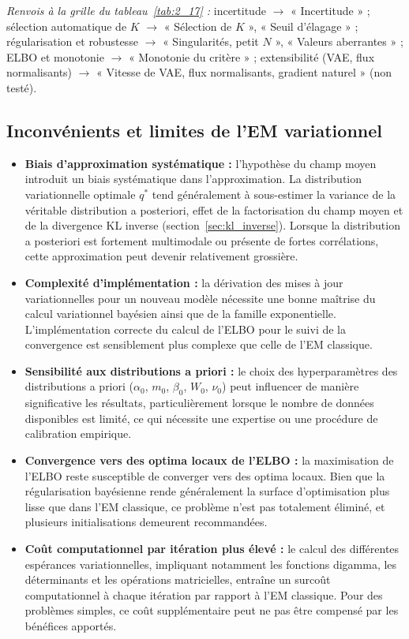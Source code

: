 \par\noindent\emph{Renvois à la grille du tableau~\ref{tab:2_17} :} incertitude $\to$ « Incertitude » ; sélection automatique de $K$ $\to$ « Sélection de $K$ », « Seuil d'élagage » ; régularisation et robustesse $\to$ « Singularités, petit $N$ », « Valeurs aberrantes » ; ELBO et monotonie $\to$ « Monotonie du critère » ; extensibilité (VAE, flux normalisants) $\to$ « Vitesse de VAE, flux normalisants, gradient naturel » (non testé).
\subsection{Inconvénients et limites de l'EM variationnel}\label{sec:limites_vb}
\begin{itemize}
\item \textbf{Biais d'approximation systématique : }l'hypothèse du champ moyen introduit un biais systématique dans l'approximation. La distribution variationnelle optimale $q^{*}$ tend généralement à sous-estimer la variance de la véritable distribution a posteriori, effet de la factorisation du champ moyen et de la divergence KL inverse (section~\ref{sec:kl_inverse}). Lorsque la distribution a posteriori est fortement multimodale ou présente de fortes corrélations, cette approximation peut devenir relativement grossière.
\item \textbf{Complexité d'implémentation : }la dérivation des mises à jour variationnelles pour un nouveau modèle nécessite une bonne maîtrise du calcul variationnel bayésien ainsi que de la famille exponentielle. L'implémentation correcte du calcul de l'ELBO pour le suivi de la convergence est sensiblement plus complexe que celle de l'EM classique.
\item \textbf{Sensibilité aux distributions a priori : }le choix des hyperparamètres des distributions a priori ($\alpha _{0}$, $m_{0}$, $\beta _{0}$, $W_{0}$, $\nu _{0}$) peut influencer de manière significative les résultats, particulièrement lorsque le nombre de données disponibles est limité, ce qui nécessite une expertise ou une procédure de calibration empirique.
\item \textbf{Convergence vers des optima locaux de l'ELBO : }la maximisation de l'ELBO reste susceptible de converger vers des optima locaux. Bien que la régularisation bayésienne rende généralement la surface d'optimisation plus lisse que dans l'EM classique, ce problème n'est pas totalement éliminé, et plusieurs initialisations demeurent recommandées.
\item \textbf{Coût computationnel par itération plus élevé : }le calcul des différentes espérances variationnelles, impliquant notamment les fonctions digamma, les déterminants et les opérations matricielles, entraîne un surcoût computationnel à chaque itération par rapport à l'EM classique. Pour des problèmes simples, ce coût supplémentaire peut ne pas être compensé par les bénéfices apportés.

\end{itemize}
